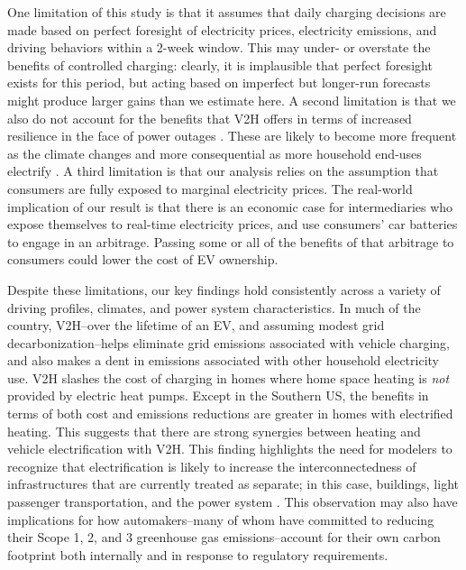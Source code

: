 \documentclass[11pt,preprint]{elsarticle}
\begin{document}
One limitation of this study is that it assumes that daily charging decisions are made based on perfect foresight of electricity prices, electricity emissions, and driving behaviors within a 2-week window. This may under- or overstate the benefits of controlled charging: clearly, it is implausible that perfect foresight exists for this period, but acting based on imperfect but longer-run forecasts might produce larger gains than we estimate here. A second limitation is that we also do not account for the benefits that V2H offers in terms of increased resilience in the face of power outages \cite{ahmad_increase_2021,perera_quantifying_2020,v_spatiotemporal_2023}. These are likely to become more frequent as the climate changes and more consequential as more household end-uses electrify \cite{noauthor_surging_2022}. A third limitation is that our analysis relies on the assumption that consumers are fully exposed to marginal electricity prices. The real-world implication of our result is that there is an economic case for intermediaries who expose themselves to real-time electricity prices, and use consumers' car batteries to engage in an arbitrage. Passing some or all of the benefits of that arbitrage to consumers could lower the cost of EV ownership. 

Despite these limitations, our key findings hold consistently across a variety of driving profiles, climates, and power system characteristics. In much of the country, V2H--over the lifetime of an EV, and assuming modest grid decarbonization--helps eliminate grid emissions associated with vehicle charging, and also makes a dent in emissions associated with other household electricity use. V2H slashes the cost of charging in homes where home space heating is \textit{not} provided by electric heat pumps. Except in the Southern US, the benefits in terms of both cost and emissions reductions are greater in homes with electrified heating. This suggests that there are strong synergies between heating and vehicle electrification with V2H. This finding highlights the need for modelers to recognize that electrification is likely to increase the interconnectedness of infrastructures that are currently treated as separate; in this case, buildings, light passenger transportation, and the power system \cite{vaishnav_implications_2023}. This observation may also have implications for how automakers--many of whom have committed to reducing their Scope 1, 2, and 3 greenhouse gas emissions--account for their own carbon footprint both internally and in response to regulatory requirements. 
\end{document}
